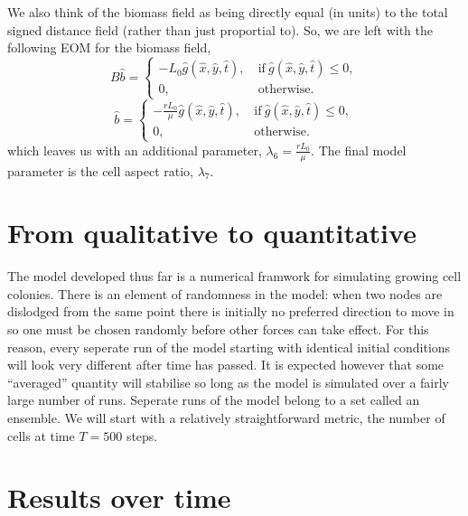  We also think of the biomass
field as being directly equal (in units) to the total signed distance field (rather than just proportial to).
So, we are left with the following EOM for the biomass field,
\begin{equation*}
    B\hat{b} = \begin{cases}
                -  L_0\hat{g}(\hat{x},\hat{y},\hat{t}), & \ \textrm{if} \ \hat{g}(\hat{x},\hat{y},\hat{t}) \leq 0, \\
                    0, &    \ \textrm{otherwise}.
               \end{cases}
\end{equation*}
\begin{equation*}
    \hat{b} = \begin{cases}
                -  \frac{r L_0}{\mu}\hat{g}(\hat{x},\hat{y},\hat{t}), & \ \textrm{if} \ \hat{g}(\hat{x},\hat{y},\hat{t}) \leq 0, \\
                    0, &    \ \textrm{otherwise}.
               \end{cases}
\end{equation*}
which leaves us with an additional parameter, $\lambda_6 =\frac{r L_0}{\mu}$. The final model parameter is the cell aspect ratio, $\lambda_7$.


\section{From qualitative to quantitative}
The model developed thus far is a numerical framwork for simulating growing cell colonies.
There is an element of randomness in the model: when two nodes are dislodged from the 
same point there is initially no preferred direction to move in so one must be chosen randomly
before other forces can take effect. For this reason, every seperate run of the model 
starting with identical initial conditions will look very different after time has passed. 
It is expected however that some ``averaged''
quantity will stabilise so long as the model is simulated over a fairly large number of runs.
Seperate runs of the model belong to a set called an ensemble.
We will start with a relatively straightforward metric, the number of cells at time
$T = 500$ steps.

\section{Results over time}

